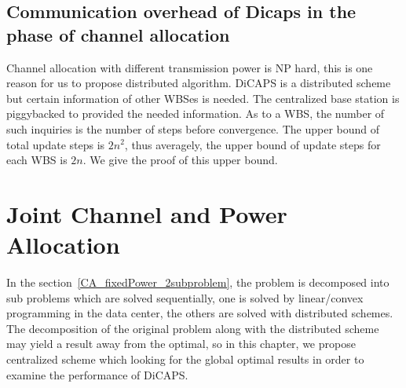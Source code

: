 \subsection{Communication overhead of Dicaps in the phase of channel allocation}

Channel allocation with different transmission power is NP hard, this is one reason for us to propose distributed algorithm.
DiCAPS is a distributed scheme but certain information of other WBSes is needed.
The centralized base station is piggybacked to provided the needed information.
As to a WBS, the number of such inquiries is the number of steps before convergence.
The upper bound of total update steps is $2n^2$, thus averagely, the upper bound of update steps for each WBS is $2n$.
We give the proof of this upper bound. 


\section{Joint Channel and Power Allocation}
In the section~\ref{CA_fixedPower_2subproblem}, the problem is decomposed into sub problems which are solved sequentially, one is solved by linear/convex programming in the data center, the others are solved with distributed schemes.
The decomposition of the original problem along with the distributed scheme may yield a result away from the optimal, so in this chapter, we propose centralized scheme which looking for the global optimal results in order to examine the performance of DiCAPS.



